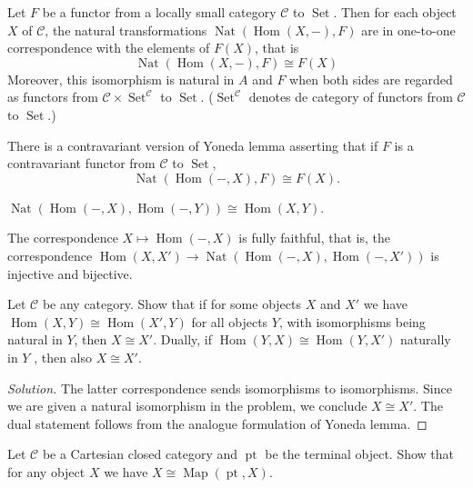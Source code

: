 \documentclass{article}
\numberwithin{equation}{section}
\newcommand{\Cc}{\mathcal{C}}
\DeclareMathOperator{\pt}{pt}
\DeclareMathOperator{\Set}{Set}
\DeclareMathOperator{\Hom}{Hom}
\DeclareMathOperator{\Map}{Map}
\DeclareMathOperator{\Nat}{Nat}
\begin{document}
\begin{lemma}
	Let $F$ be a functor from a locally small category $\Cc$ to $\Set$. Then for each object $X$ of $\Cc$, the natural transformations $\Nat(\Hom(X,-),F)$ are in one-to-one correspondence with the elements of $F(X)$, that is
	\[\Nat(\Hom(X,-), F)\cong F(X)\]
	Moreover, this isomorphism is natural in $A$ and $F$ when both sides are regarded as functors from $\Cc\times\Set^{\Cc}$ to $\Set$. ($\Set^{\Cc}$ denotes de category of functors from $\Cc$ to $\Set$.)
	
	There is a contravariant version of Yoneda lemma asserting that if $F$ is a contravariant functor from $\Cc$ to $\Set$,
	\[\Nat(\Hom(-,X), F)\cong F(X).\]
\end{lemma}
\begin{coro}
	$\Nat (\Hom(-,X),\Hom(-,Y))\cong\Hom(X,Y)$.
\end{coro}
\begin{remark}
	The correspondence $X\mapsto\Hom(-,X)$ is fully faithful, that is, the correspondence $\Hom(X,X')\to\Nat(\Hom(-,X),\Hom(-,X'))$ is injective and bijective.
\end{remark}
\begin{exercise}[a]
	Let $\Cc$ be any category. Show that if for some objects $X$ and $X'$ we have $\Hom(X, Y )\cong \Hom(X', Y )$ for all objects $Y$, with isomorphisms being natural in $Y$, then $X\cong X'$. Dually, if $\Hom(Y, X) \cong \Hom(Y, X')$ naturally in $Y$ , then also $X\cong X'$.
\end{exercise}
\begin{proof}[Solution]
	The latter correspondence sends isomorphisms to isomorphisms. Since we are given a natural isomorphism in the problem, we conclude $X\cong X'$. The dual statement follows from the analogue formulation of Yoneda lemma.
\end{proof}
\begin{exercise}
	Let $\Cc$ be a Cartesian closed category and $\pt$ be the terminal object. Show that for any object $X$ we have $X\cong\Map(\pt,X)$.
\end{exercise}
\end{document}
